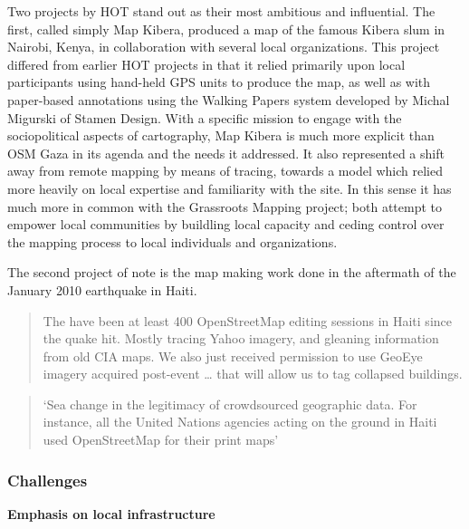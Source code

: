 \documentclass[11pt]{report}
\begin{document}
Two projects by HOT stand out as their most ambitious and influential. The first, called simply Map Kibera, produced a map of the famous Kibera slum in Nairobi, Kenya, in collaboration with several local organizations. This project differed from earlier HOT projects in that it relied primarily upon local participants using hand-held GPS units to produce the map, as well as with paper-based annotations using the Walking Papers system developed by Michal Migurski of Stamen Design. With a specific mission to engage with the sociopolitical aspects of cartography, Map Kibera is much more explicit than OSM Gaza in its agenda and the needs it addressed. It also represented a shift away from remote mapping by means of tracing, towards a model which relied more heavily on local expertise and familiarity with the site. In this sense it has much more in common with the Grassroots Mapping project; both attempt to empower local communities by buildling local capacity and ceding control over the mapping process to local individuals and organizations. 

The second project of note is the map making work done in the aftermath of the January 2010 earthquake in Haiti.

\begin{quote}The have been at least 400 OpenStreetMap editing sessions in Haiti since the quake hit. Mostly tracing Yahoo imagery, and gleaning information from old CIA maps. We also just received permission to use GeoEye imagery acquired post-event … that will allow us to tag collapsed buildings.\end{quote} \cite{maron2010haiti}

\begin{quote}`Sea change in the legitimacy of crowdsourced geographic data. For instance, all the United Nations agencies acting on the ground in Haiti used OpenStreetMap for their print maps'\end{quote} \cite{glennon2010grassrootscrisis}

\subsubsection{Challenges}
\textbf{Emphasis on local infrastructure}
\end{document}
